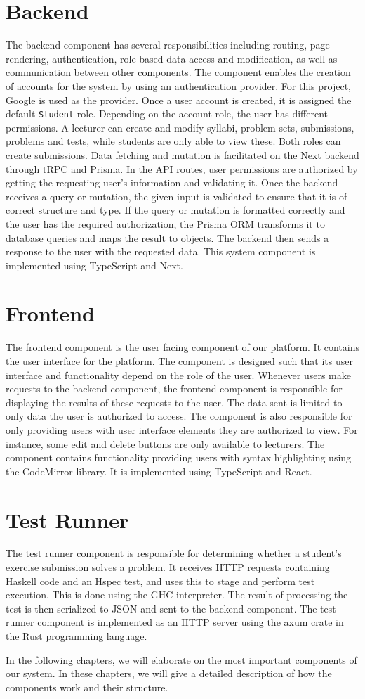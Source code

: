 \section{Backend}
The backend component has several responsibilities including routing, page rendering, authentication, role based data access and modification, as well as communication between other components.
The component enables the creation of accounts for the system by using an authentication provider.
For this project, Google is used as the provider.
Once a user account is created, it is assigned the default \texttt{Student} role.
Depending on the account role, the user has different permissions.
A lecturer can create and modify syllabi, problem sets, submissions, problems and tests, while students are only able to view these. Both roles can create submissions.
Data fetching and mutation is facilitated on the Next backend through tRPC and Prisma. In the API routes, user permissions are authorized by getting the requesting user's information and validating it.
Once the backend receives a query or mutation, the given input is validated to ensure that it is of correct structure and type.
If the query or mutation is formatted correctly and the user has the required authorization, the Prisma ORM transforms it to database queries and maps the result to \javascript{} objects.
The backend then sends a response to the user with the requested data.
This system component is implemented using TypeScript and Next.

\section{Frontend} \label{sec:architecture-frontend}
The frontend component is the user facing component of our platform.  It contains the user interface for the platform.
The component is designed such that its user interface and functionality depend on the role of the user.
Whenever users make requests to the backend component, the frontend component is responsible for displaying the results of these requests to the user. The data sent is limited to only data the user is authorized to access.
The component is also responsible for only providing users with user interface elements they are authorized to view.
For instance, some edit and delete buttons are only available to lecturers.
The component contains functionality providing users with syntax highlighting using the CodeMirror library.
It is implemented using TypeScript and React.

\section{Test Runner}
The test runner component is responsible for determining whether a student's exercise submission solves a problem.
It receives HTTP requests containing Haskell code and an Hspec test, and uses this to stage and perform test execution.
This is done using the GHC interpreter.
The result of processing the test is then serialized to JSON and sent to the backend component.
The test runner component is implemented as an HTTP server using the axum crate in the Rust programming language.

In the following chapters, we will elaborate on the most important components of our system. In these chapters, we will give a detailed description of how the components work and their structure.